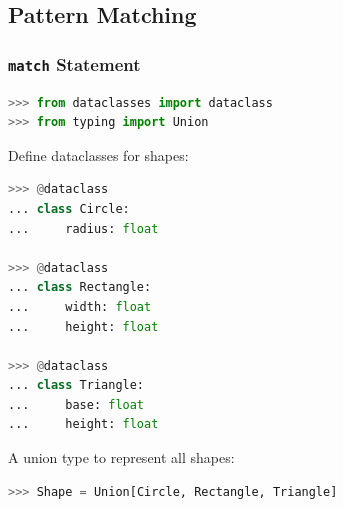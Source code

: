 \documentclass[envcountsect,10pt]{beamer}
\begin{document}
\subsection{Pattern Matching}

\begin{frame}[fragile]
    \frametitle{\texttt{match} Statement}

    \begin{lstlisting}[language=Python]
>>> from dataclasses import dataclass
>>> from typing import Union
    \end{lstlisting}

Define dataclasses for shapes:

    \begin{lstlisting}[language=Python]
>>> @dataclass
... class Circle:
...     radius: float

>>> @dataclass
... class Rectangle:
...     width: float
...     height: float

>>> @dataclass
... class Triangle:
...     base: float
...     height: float
    \end{lstlisting}

A union type to represent all shapes:

    \begin{lstlisting}[language=Python]
>>> Shape = Union[Circle, Rectangle, Triangle]
    \end{lstlisting}

\end{frame}
\end{document}
